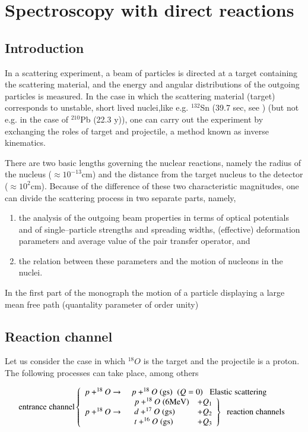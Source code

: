 \documentclass[a4paper,14pt]{book}
\begin{document}
 \setcounter{chapter}{1}
\chapter{Spectroscopy with direct reactions}
\section{Introduction}

In a scattering experiment, a beam of particles is directed at a target containing the scattering material, and the energy and angular
distributions of the outgoing particles is measured. In the case in which the scattering material (target) corresponds to unstable, short lived nuclei,like e.g. $^{132}$Sn (39.7 sec, see \cite{..}) (but not e.g. in the case of $^{210}$Pb (22.3 y)), one can carry out the experiment by exchanging the roles of target and projectile, a method known as inverse kinematics.

 
There are two basic lengths governing the nuclear reactions, namely the radius of the nucleus ($\approx 10^{-13}$cm) and the distance from the target nucleus to the detector ($\approx 10^2$cm). Because of the difference of these two characteristic magnitudes, one can divide the scattering process in two separate parts, namely,

\begin{enumerate}
\item{the analysis of the outgoing beam properties in terms of optical potentials and of single--particle strengths and spreading widths, (effective) deformation parameters and average value of the pair transfer operator, and}
\item{the relation between these parameters and the motion of nucleons in the nuclei.}
\end{enumerate}

In the first part of the monograph the motion of a particle displaying a large mean free path (quantality parameter of order unity)


\section{Reaction channel}

Let us consider the case in which $^{18}O$ is the target and the projectile is a proton. The following processes can take place, among others

\begin{equation}
{\rm entrance\;channel} \left\{
\begin{array}{rl}
p+^{18}O \rightarrow & \;p + ^{18}O \;({\rm gs})\;\; (Q=0) \;\;\; {\rm Elastic\; scattering} \\
p+^{18}O \rightarrow & \left. \begin{array}{ll}
     p + ^{18}O \;({\rm 6 MeV}) & + Q_1 \\
     d + ^{17}O \;({\rm gs})    & + Q_2 \\
     t + ^{16}O \;({\rm gs})    & + Q_3
		 \end{array} \right\} \;\; {\rm reaction\;channels}
\end{array}
\right.
\end{equation}
\end{document}
